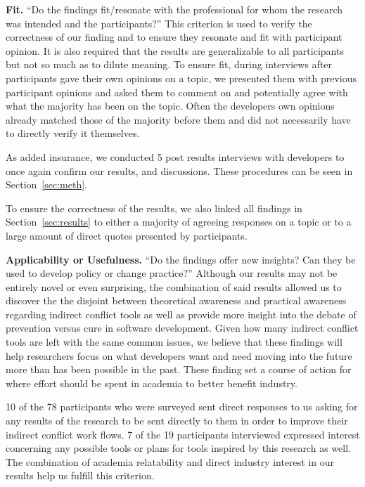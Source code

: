 \documentclass[conference]{IEEEtran}
\begin{document}
{\bfseries Fit.} ``Do the findings fit/resonate with the professional for whom the research was intended and the participants?'' This
criterion is used to verify the correctness of our finding and to ensure they resonate and fit with participant opinion. It is also
required that the results are generalizable to all participants but not so much as to dilute meaning. To ensure fit, during interviews
after participants gave their own opinions on a topic, we presented them with previous participant opinions and asked them to comment
on and potentially agree with what the majority has been on the topic. Often the developers own opinions already matched those of
the majority before them and did not necessarily have to directly verify it themselves.

As added insurance, we conducted 5 post results interviews with developers to once again confirm our results, and discussions. These
procedures can be seen in Section~\ref{sec:meth}.

To ensure the correctness of the results, we also linked all findings in Section~\ref{sec:results} to either a majority of agreeing
responses on a topic or to a large amount of direct quotes presented by participants.

{\bfseries Applicability or Usefulness.} ``Do the findings offer new insights? Can they be used to develop policy or change practice?''
Although our results may not be entirely novel or even surprising, the combination of said results allowed us to discover the
the disjoint between theoretical awareness and practical awareness regarding indirect conflict tools as well as provide more
insight into the debate of prevention versus cure in software development. Given how many indirect conflict tools are left with the same common
issues, we believe that these findings will help researchers focus on what developers want and need moving into the future more than has
been possible in the past. These finding set a course of action for where effort should be spent in academia to better benefit industry.

10 of the 78 participants who were surveyed sent direct responses to us asking for any results of the research to be sent directly to
them in order to improve their indirect conflict work flows. 7 of the 19 participants interviewed expressed interest concerning any possible
tools or plans for tools inspired by this research as well. The combination of academia relatability and direct industry interest 
in our results help us fulfill this criterion.
\end{document}
